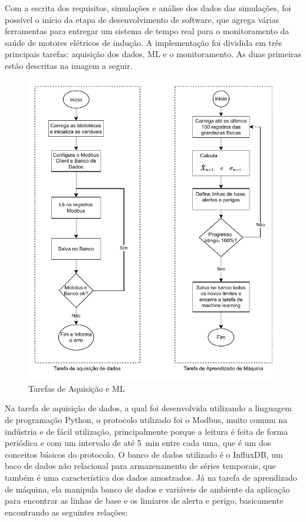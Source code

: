 Com a escrita dos requisitos, simulações e análise dos dados das simulações, foi possível o início da etapa de desenvolvimento de software,
que agrega várias ferramentas para entregar um sistema de tempo real para o monitoramento da saúde de motores elétricos de indução. A 
implementação foi dividida em três principais tarefas: aquisição dos dados, ML e o monitoramento. As duas primeiras estão
descritas na imagem a seguir.

\begin{figure}[H]
    \caption{Tarefas de Aquisição e ML}
    \begin{center}
        \includegraphics[scale=1, page=1]{metodologia/img/software.pdf}
    \end{center}
    \label{fig:tarefa_aq_ml}
\end{figure}

Na tarefa de aquisição de dados, a qual foi desenvolvida utilizando a linguagem de programação Python, o protocolo utilizado foi o Modbus, 
muito comum na indústria e de fácil utilização, principalmente porque a leitura é feita de forma periódica e com um intervalo de até 
\SI{5}{\minute} entre cada uma, que é um dos conceitos básicos do protocolo. O banco de dados utilizado é o InfluxDB, um baco de dados não 
relacional para armazenamento de séries temporais, que também é uma característica dos dados amostrados.
Já na tarefa de aprendizado de máquina, ela  manipula banco de dados e variáveis de ambiente da aplicação para encontrar as linhas de base e
os limiares de alerta e perigo, basicamente encontrando as seguintes relações:

